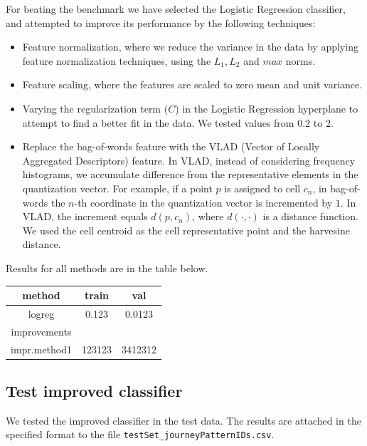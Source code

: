 \documentclass[12pt]{article}
\begin{document}
  For beating the benchmark we have selected the Logistic Regression classifier,
  and attempted to improve its performance by the following techniques:
  \begin{itemize}
    \item Feature normalization, where we reduce the variance in the data by
      applying feature normalization techniques, using the $L_1, L_2$ and $max$ norms.
      \item Feature scaling, where the features are scaled to zero mean and unit variance.
    \item Varying the regularization term ($C$) in the Logistic Regression hyperplane
      to attempt to find a better fit in the data. We tested values from $0.2$ to $2$.
     \item Replace the bag-of-words feature with the VLAD (Vector of Locally
       Aggregated Descriptors) feature. In VLAD,
       instead of considering frequency histograms, we accumulate difference
       from the representative elements in the quantization vector. For example,
       if a point $p$ is assigned to cell $c_n$, in bag-of-words the $n$-th
       coordinate in the quantization vector is incremented by $1$. In VLAD, the
       increment equals $d(p,c_n)$, where $d(\cdot,\cdot)$ is a distance function.
       We used the cell centroid as the cell representative point and the
       harvesine distance. 
     
  \end{itemize}
  Results for all methods are in the table below.
	
  \begin{table}[H]
    \centering
    \begin{tabular}{|c|c|c|}
    \hline
      method & train & val \\ \hline
      logreg & 0.123 & 0.0123 \\ \hline

\hline
      improvements & & \\ \hline
       impr.method1 & 123123 & 3412312 \\ \hline
    \end{tabular}
    \end{table}
	\subsection{Test improved classifier}
  We tested the improved classifier in the test data. The results are attached
  in the specified format to the file \texttt{testSet\_journeyPatternIDs.csv}.
	
\end{document}
